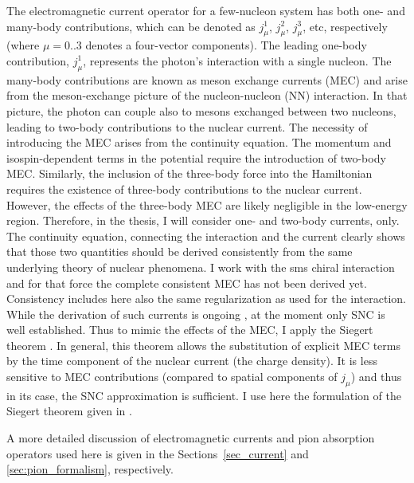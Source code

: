 The electromagnetic current operator for a few-nucleon system has both one- and many-body contributions, which
can be denoted as $j_\mu^1$, $j_\mu^2$, $j_\mu^3$, etc, respectively 
(where $\mu = 0..3$ denotes a four-vector components).
The leading one-body contribution,
$j_\mu^1$, represents the photon's interaction with a single nucleon. The many-body contributions are known as
meson exchange currents (MEC) and arise from the meson-exchange picture of the nucleon-nucleon (NN)
interaction. 
In that picture, the photon can couple also to mesons exchanged between two nucleons, leading to two-body contributions to
the nuclear current.
The necessity of introducing the MEC arises from the continuity equation.
The momentum and isospin-dependent terms 
in the potential require the introduction of two-body MEC.
Similarly, the inclusion of the three-body force into the Hamiltonian requires the
existence of three-body contributions to the nuclear current. However, the effects of the three-body MEC are
likely negligible in the low-energy region.
Therefore, in the thesis, I will consider one- and two-body currents, only.
The continuity equation, connecting the interaction and the current clearly shows 
that those two quantities should be derived consistently from the same underlying theory
of nuclear phenomena.
I work with the \gls{sms} chiral interaction and for that force the complete consistent MEC
has not been derived yet.
Consistency includes here also the same regularization as used for the interaction.
While the derivation of such currents is ongoing \cite{krebs_private}, at the moment
only SNC is well established.
Thus to mimic the effects of the MEC, I apply the Siegert theorem \cite{Siegert, GolakKamad2000_ExplDescr}.
In general, this theorem allows the substitution of explicit MEC terms by the time component of the nuclear current (the charge density).
It is less sensitive to MEC contributions (compared to spatial components of $j_\mu$)
and thus in its case, the SNC approximation is sufficient.
I use here the formulation of the Siegert theorem given in \cite{GolakKamad2000_ExplDescr}.

A more detailed discussion of electromagnetic currents and pion absorption operators used here is given 
in the Sections~\ref{sec_current} and \ref{sec:pion_formalism}, respectively.




